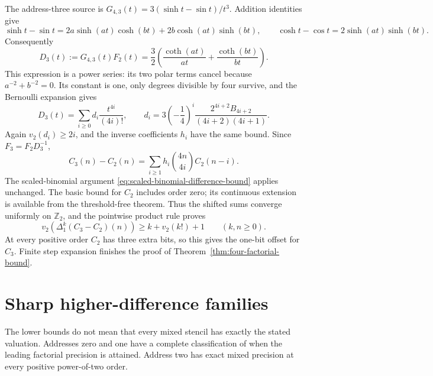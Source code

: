 The address-three source is
$G_{4,3}(t)=3(\sinh t-\sin t)/t^3$. Addition identities give
\[
 \sinh t-\sin t
 =2a\sinh(at)\cosh(bt)+2b\cosh(at)\sinh(bt),
 \qquad \cosh t-\cos t=2\sinh(at)\sinh(bt).
\]
Consequently
\begin{equation}
 D_3(t):=G_{4,3}(t)F_2(t)
 =\frac32\left(\frac{\coth(at)}{at}
                            +\frac{\coth(bt)}{bt}\right).
 \label{eq:address-three-cotangent-factor}
\end{equation}
This expression is a power series: its two polar terms cancel because
$a^{-2}+b^{-2}=0$. Its constant is one, only degrees divisible by four
survive, and the Bernoulli expansion gives
\begin{equation}
 D_3(t)=\sum_{i\geq0}d_i\frac{t^{4i}}{(4i)!},\qquad
 d_i=3\left(-\frac14\right)^i
          \frac{2^{4i+2}B_{4i+2}}{(4i+2)(4i+1)}.
 \label{eq:address-three-packets}
\end{equation}
Again $v_2(d_i)\geq2i$, and the inverse coefficients $h_i$ have the same
bound. Since $F_3=F_2D_3^{-1}$,
\begin{equation}
 C_3(n)-C_2(n)=\sum_{i\geq1}h_i\binom{4n}{4i}C_2(n-i).
 \label{eq:address-three-exact-transfer}
\end{equation}
The scaled-binomial argument
\eqref{eq:scaled-binomial-difference-bound} applies unchanged.
The basic bound for $C_2$ includes order zero; its continuous extension
is available from the threshold-free theorem. Thus the shifted sums
converge uniformly on $\mathbb Z_2$, and the pointwise product rule
proves
\begin{equation}
 v_2(\Delta_1^k(C_3-C_2)(n))\geq k+v_2(k!)+1
                                      \qquad(k,n\geq0).
 \label{eq:address-three-extra-bit}
\end{equation}
At every positive order $C_2$ has three extra bits, so this gives the
one-bit offset for $C_3$. Finite step expansion finishes the proof of
Theorem~\ref{thm:four-factorial-bound}.

\section{Sharp higher-difference families}
\label{sec:sharp-higher-final}

The lower bounds do not mean that every mixed stencil has exactly the
stated valuation. Addresses zero and one have a complete classification
of when the leading factorial precision is attained. Address two has
exact mixed precision at every positive power-of-two order.

